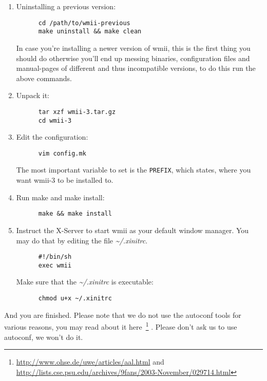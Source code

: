 \documentclass[12pt,a4paper]{article} %
\newcommand{\hrefx}[1]{\href{#1}{#1}} %
\begin{document}
    \begin{enumerate}
    
    \item Uninstalling a previous version:
    \begin{verbatim}
      cd /path/to/wmii-previous
      make uninstall && make clean 
    \end{verbatim}

    In case you're installing a newer version of wmii, this is the
    first thing you should do otherwise you'll end up messing
    binaries, configuration files and manual-pages of different and
    thus incompatible versions, to do this run the above commands.
    
    \item Unpack it:
    \begin{verbatim}
      tar xzf wmii-3.tar.gz
      cd wmii-3
    \end{verbatim}
  
    \item Edit the configuration:
    \begin{verbatim}
      vim config.mk
    \end{verbatim}
    
    The most important variable to set is the \verb+PREFIX+, which
    states, where you want wmii-3 to be installed to.
    
    \item Run make and make install:
    \begin{verbatim}
      make && make install
    \end{verbatim}
    
    \item Instruct the X-Server to start wmii as your default window
    manager. You may do that by editing the file \emph{\~{}/.xinitrc}.

    \begin{verbatim}
      #!/bin/sh
      exec wmii
    \end{verbatim}

    Make sure that the \emph{\~{}/.xinitrc} is executable:

    \begin{verbatim}
      chmod u+x ~/.xinitrc
    \end{verbatim}

    \end{enumerate}
    
    And you are finished. Please note that we do not use the autoconf
    tools for various reasons, you may read about it here~\footnote{
    \hrefx{http://www.ohse.de/uwe/articles/aal.html} \linebreak[1] and
    \hrefx{http://lists.cse.psu.edu/archives/9fans/2003-November/029714.html}
    } . Please don't ask us to use autoconf, we won't do it.
\end{document}
